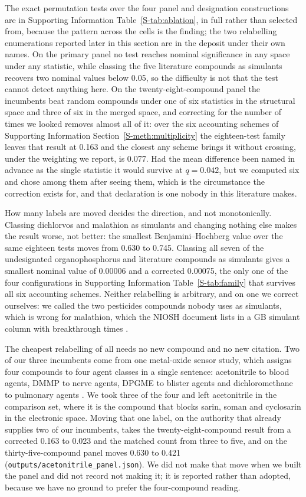 \documentclass[journal=ancham,manuscript=article,margin=1in]{achemso}
\begin{document}
The exact permutation tests over the four panel and designation constructions
are in Supporting Information Table~\ref{S-tab:ablation}, in full rather than
selected from, because the pattern across the cells is the finding; the two
relabelling enumerations reported later in this section are in the deposit
under their own names. On the primary panel no test reaches
nominal significance in any space under any statistic, while classing the five
literature compounds as simulants recovers two nominal values below 0.05, so the
difficulty is not that the test cannot detect anything here. On the
twenty-eight-compound panel the incumbents beat random compounds under one of
six statistics in the structural space and three of six in the merged space, and
correcting for the number of times we looked removes almost all of it: over the
six accounting schemes of Supporting Information
Section~\ref{S-meth:multiplicity} the eighteen-test family leaves that result at
0.163 and the closest any scheme brings it without crossing, under the weighting we report, is 0.077. Had the
mean difference been named in advance as the single statistic it would survive
at $q=0.042$, but we computed six and chose among them after seeing them,
which is the circumstance the correction exists for, and that declaration is one
nobody in this literature makes.

How many labels are moved decides the direction, and not monotonically. Classing
dichlorvos and malathion as simulants and changing nothing else makes the result
worse, not better: the smallest Benjamini--Hochberg value over the same eighteen
tests moves from 0.630 to 0.745. Classing all seven of the undesignated
organophosphorus and literature compounds as simulants gives a smallest nominal
value of 0.00006 and a corrected 0.00075, the only one of the four
configurations in Supporting Information Table~\ref{S-tab:family} that survives
all six accounting schemes. Neither relabelling is arbitrary, and on one we
correct ourselves: we called the two pesticides compounds nobody uses as
simulants, which is wrong for malathion, which the NIOSH document lists in a GB
simulant column with breakthrough times \cite{niosh2002simulant}.

The cheapest relabelling of all needs no new compound and no new citation. Two
of our three incumbents come from one metal-oxide sensor study, which assigns
four compounds to four agent classes in a single sentence: acetonitrile to blood
agents, DMMP to nerve agents, DPGME to blister agents and dichloromethane to
pulmonary agents \cite{lee2011sno2}. We took three of the four and left
acetonitrile in the comparison set, where it is the compound that blocks sarin,
soman and cyclosarin in the electronic space. Moving that one label, on the
authority that already supplies two of our incumbents, takes the
twenty-eight-compound result from a corrected 0.163 to 0.023 and the matched
count from three to five, and on the thirty-five-compound panel moves 0.630 to
0.421 (\texttt{outputs/acetonitrile\_panel.json}). We did not make that move
when we built the panel and did not record not making it; it is reported rather
than adopted, because we have no ground to prefer the four-compound reading.
\end{document}
